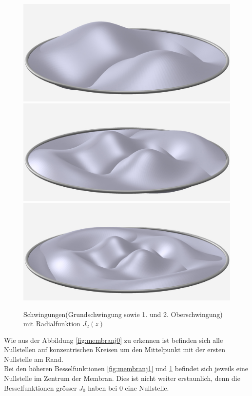 \begin{figure}
        \includegraphics[width=0.33\hsize]{./kreis/membran/circle-1-2.jpg}
        \includegraphics[width=0.33\hsize]{./kreis/membran/circle-2-2.jpg}
        \includegraphics[width=0.33\hsize]{./kreis/membran/circle-3-2.jpg}
        \caption{Schwingungen(Grundschwingung sowie 1. und 2. Oberschwingung) mit Radialfunktion $J_2(z)$}
        \label{fig:membranj2}
\end{figure}
Wie aus der Abbildung \ref{fig:membranj0} zu erkennen ist befinden sich alle Nullstellen auf konzentrischen Kreisen um den Mittelpunkt mit der ersten Nullstelle am Rand.
\\
Bei den höheren Besselfunktionen \ref{fig:membranj1} und \ref{fig:membranj2} befindet sich jeweils eine Nullstelle im Zentrum der Membran. Dies ist nicht weiter erstaunlich, denn die Besselfunktionen grösser $J_0$ haben bei 0 eine Nullstelle. 
